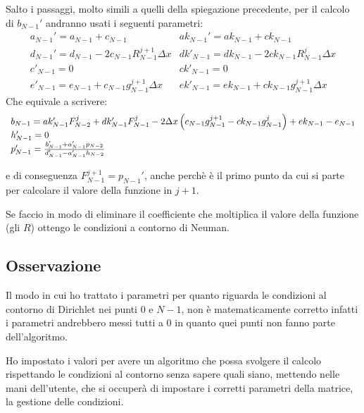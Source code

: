 Salto i passaggi, molto simili a quelli della spiegazione precedente,
per il calcolo di $b_{N-1}'$ andranno usati i seguenti parametri:
\begin{equation}
  \begin{array}{ll}
    a_{N-1}' = a_{N-1}+c_{N-1} & ak_{N-1}' = ak_{N-1}+ck_{N-1}\\
    d_{N-1}' = d_{N-1} - 2 c_{N-1} R_{N-1}^{j+1}\Delta x& dk'_{N-1} = dk_{N-1} - 2 ck_{N-1} R_{N-1}^{j}\Delta x\\
    c'_{N-1} = 0 & ck'_{N-1}= 0\\
    e'_{N-1} = e_{N-1} + c_{N-1} g^{j+1}_{N-1}\Delta x & ek'_{N-1} = ek_{N-1} + ck_{N-1} g^{j+1}_{N-1}\Delta x
  \end{array}
\end{equation}
Che equivale a scrivere:
\begin{equation}
  \begin{array}{l}
    b_{N-1} = ak_{N-1}' F_{N-2}^j + dk'_{N-1} F_{N-1}^j - 2 \Delta x \left( c_{N-1} g^{j+1}_{N-1}-ck_{N-1} g^j_{N-1} \right) + ek_{N-1} - e_{N-1} \\
    h_{N-1}' = 0\\
    p_{N-1}' = \frac{b_{N-1}' + a_{N-1}'p_{N-2}}{d_{N-1}' - a_{N-1}'h_{N-2}}
  \end{array}
\end{equation}

e di conseguenza $F_{N-1}^{j+1} = p_{N-1}'$, anche perch\`e \`e il primo punto da cui si parte per calcolare il valore della funzione in $j+1$.

Se faccio in modo di eliminare il coefficiente che moltiplica il valore della funzione (gli $R$) ottengo le condizioni a  contorno di Neuman.
\subsection{Osservazione}
Il modo in cui ho trattato i parametri per quanto riguarda le condizioni al contorno di Dirichlet nei punti $0$ e $N-1$, non \`e matematicamente corretto infatti i parametri andrebbero messi tutti a 0 in quanto quei punti non fanno parte dell'algoritmo.

Ho impostato i valori  per avere un algoritmo che possa svolgere il calcolo rispettando le condizioni al contorno senza sapere quali siano, mettendo nelle mani dell'utente, che si occuper\`a di impostare i corretti parametri della matrice, la gestione delle condizioni.

